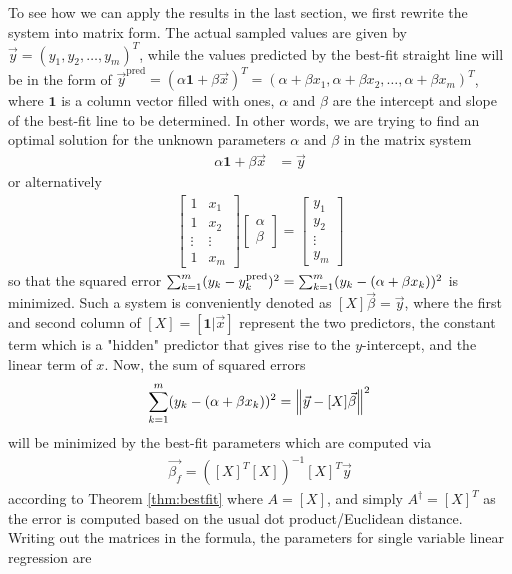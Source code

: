 To see how we can apply the results in the last section, we first rewrite the system into matrix form. The actual sampled values are given by $\vec{y} = (y_1, y_2, \ldots, y_m)^T$, while the values predicted by the best-fit straight line will be in the form of $\vec{y}^{\text{pred}} = (\alpha\textbf{1} + \beta \vec{x})^T = (\alpha + \beta x_1, \alpha + \beta x_2, \ldots, \alpha + \beta x_m)^T$, where $\textbf{1}$ is a column vector filled with ones, $\alpha$ and $\beta$ are the intercept and slope of the best-fit line to be determined. In other words, we are trying to find an optimal solution for the unknown parameters $\alpha$ and $\beta$ in the matrix system
\begin{align}
\alpha\textbf{1} + \beta \vec{x} &= \vec{y}
\end{align}
or alternatively
\begin{align}
\begin{bmatrix}
1 & x_1 \\
1 & x_2 \\
\vdots & \vdots \\
1 & x_m
\end{bmatrix}
\begin{bmatrix}
\alpha \\
\beta
\end{bmatrix}
=
\begin{bmatrix}
y_1 \\
y_2 \\
\vdots \\
y_m
\end{bmatrix}
\end{align}
so that the squared error $\smash{\sum_{k=1}^m (y_k - y^{\text{pred}}_k)^2} = \sum_{k=1}^m (y_k - (\alpha + \beta x_k))^2$ is minimized. Such a system is conveniently denoted as $[X]\vec{\beta} = \vec{y}$, where the first and second column of $[X] = [\textbf{1}|\vec{x}]$ represent the two predictors, the constant term which is a "hidden" predictor that gives rise to the $y$-intercept, and the linear term of $x$. Now, the sum of squared errors
\begin{align}
\sum_{k=1}^m (y_k - (\alpha + \beta x_k))^2 = \norm{\vec{y} - [X]\vec{\beta}}^2    
\end{align}
will be minimized by the best-fit parameters which are computed via
\begin{align}
\vec{\beta_f} = ([X]^T[X])^{-1}[X]^T \vec{y}
\end{align}
according to Theorem \ref{thm:bestfit} where $A = [X]$, and simply $A^\dag = [X]^T$ as the error is computed based on the usual dot product/Euclidean distance. Writing out the matrices in the formula, the parameters for single variable linear regression are
